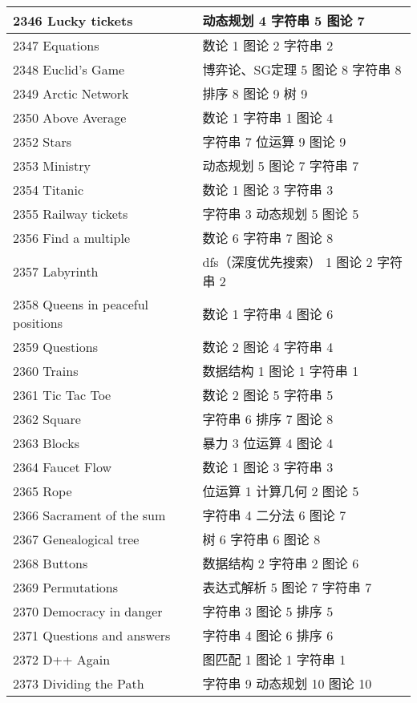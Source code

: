 \begin{longtable}{| p{} | p{} |}
 2346 Lucky tickets  & 动态规划 4 字符串 5 图论 7 \\ \hline
 2347 Equations  & 数论 1 图论 2 字符串 2 \\ \hline
 2348 Euclid's Game  & 博弈论、SG定理 5 图论 8 字符串 8 \\ \hline
 2349 Arctic Network  & 排序 8 图论 9 树 9 \\ \hline
 2350 Above Average  & 数论 1 字符串 1 图论 4 \\ \hline
 2352 Stars  & 字符串 7 位运算 9 图论 9 \\ \hline
 2353 Ministry  & 动态规划 5 图论 7 字符串 7 \\ \hline
 2354 Titanic  & 数论 1 图论 3 字符串 3 \\ \hline
 2355 Railway tickets  & 字符串 3 动态规划 5 图论 5 \\ \hline
 2356 Find a multiple  & 数论 6 字符串 7 图论 8 \\ \hline
 2357 Labyrinth  & dfs（深度优先搜索） 1 图论 2 字符串 2 \\ \hline
 2358 Queens in peaceful positions  & 数论 1 字符串 4 图论 6 \\ \hline
 2359 Questions  & 数论 2 图论 4 字符串 4 \\ \hline
 2360 Trains  & 数据结构 1 图论 1 字符串 1 \\ \hline
 2361 Tic Tac Toe  & 数论 2 图论 5 字符串 5 \\ \hline
 2362 Square  & 字符串 6 排序 7 图论 8 \\ \hline
 2363 Blocks  & 暴力 3 位运算 4 图论 4 \\ \hline
 2364 Faucet Flow  & 数论 1 图论 3 字符串 3 \\ \hline
 2365 Rope  & 位运算 1 计算几何 2 图论 5 \\ \hline
 2366 Sacrament of the sum  & 字符串 4 二分法 6 图论 7 \\ \hline
 2367 Genealogical tree  & 树 6 字符串 6 图论 8 \\ \hline
 2368 Buttons  & 数据结构 2 字符串 2 图论 6 \\ \hline
 2369 Permutations  & 表达式解析 5 图论 7 字符串 7 \\ \hline
 2370 Democracy in danger  & 字符串 3 图论 5 排序 5 \\ \hline
 2371 Questions and answers  & 字符串 4 图论 6 排序 6 \\ \hline
 2372 D++ Again  & 图匹配 1 图论 1 字符串 1 \\ \hline
 2373 Dividing the Path  & 字符串 9 动态规划 10 图论 10 \\ \hline

\end{longtable}
